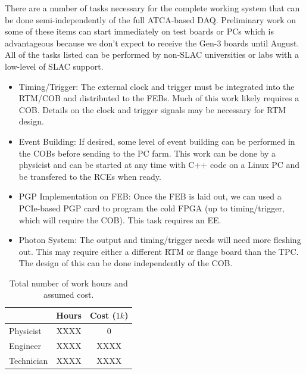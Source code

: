 There are a number of tasks necessary for the complete working system that can be done semi-independently of the full ATCA-based DAQ.  Preliminary work on some of these items can start immediately on test boards or PCs which is advantageous because we don't expect to receive the Gen-3 boards until August.  All of the tasks listed can be performed by non-SLAC universities or labs with a low-level of SLAC support.  
\begin{itemize}
\item Timing/Trigger:  The external clock and trigger must be integrated into the RTM/COB and distributed to the FEBs.  Much of this work likely requires a COB.  Details on the clock and trigger signals may be necessary for RTM design.   
\item Event Building:  If desired, some level of event building can be performed in the COBs before sending to the PC farm.  This work can be done by a physicist and can be started at any time with C++ code on a Linux PC and be transfered to the RCEs when ready.   
\item PGP Implementation on FEB:    Once the FEB is laid out,  we can used a PCIe-based PGP card to program  the cold FPGA (up to timing/trigger, which will require the COB).  This task requires an EE.    
\item Photon System:  The output and timing/trigger needs will need more fleshing out.  This may require either a different RTM or flange board than the TPC.  The design of this can be done independently of the COB.  
\end{itemize}


\begin{table}[tbh]
\begin{center}
\begin{tabular}{|l|c|c|}   
\hline \hline 
    & Hours  & Cost ($1k$) \\      
\hline
   Physicist           & XXXX&0 \\ 
   Engineer           & XXXX& XXXX\\ 
   Technician        & XXXX&XXXX \\ 
\hline \hline
\end{tabular}
\caption[]{Total number of work hours and assumed cost.}
\label{tab:labor} 
\end{center}
\end{table}



